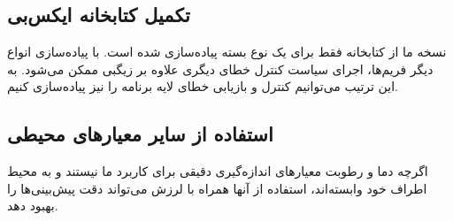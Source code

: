 \subsection{تکمیل کتابخانه ایکس‌بی}

نسخه ما از کتابخانه فقط برای یک نوع بسته پیاده‌سازی شده است. با پیاده‌سازی انواع دیگر فریم‌ها، اجرای سیاست کنترل خطای دیگری علاوه بر زیگبی ممکن می‌شود. به این ترتیب می‌توانیم کنترل و بازیابی خطای لایه برنامه را نیز پیاده‌سازی کنیم.

\subsection{استفاده از سایر معیارهای محیطی}

اگرچه دما و رطوبت معیارهای اندازه‌گیری دقیقی برای کاربرد ما نیستند و به محیط اطراف خود وابسته‌اند، استفاده از آنها همراه با لرزش می‌تواند دقت پیش‌بینی‌ها را بهبود دهد.

